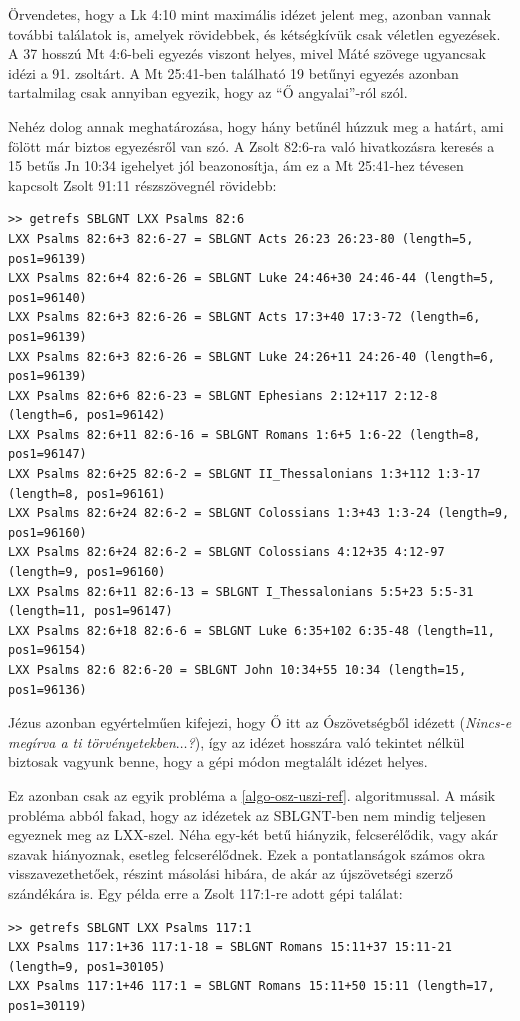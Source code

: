 \documentclass{article}
\begin{document}
Örvendetes, hogy a Lk 4:10 mint maximális idézet jelent meg, azonban vannak további találatok is,
amelyek rövidebbek, és kétségkívük csak véletlen egyezések. A 37 hosszú Mt 4:6-beli egyezés viszont
helyes, mivel Máté szövege ugyancsak idézi a 91. zsoltárt. A Mt 25:41-ben található 19
betűnyi egyezés azonban tartalmilag csak annyiban egyezik, hogy az ``Ő angyalai''-ról szól.

Nehéz dolog annak meghatározása, hogy hány betűnél húzzuk meg a határt, ami fölött már biztos
egyezésről van szó. A Zsolt 82:6-ra való hivatkozásra keresés a 15 betűs Jn 10:34 igehelyet
jól beazonosítja, ám ez a Mt 25:41-hez tévesen kapcsolt Zsolt 91:11 részszövegnél rövidebb:
\begin{lstlisting}
>> getrefs SBLGNT LXX Psalms 82:6
LXX Psalms 82:6+3 82:6-27 = SBLGNT Acts 26:23 26:23-80 (length=5, pos1=96139)
LXX Psalms 82:6+4 82:6-26 = SBLGNT Luke 24:46+30 24:46-44 (length=5, pos1=96140)
LXX Psalms 82:6+3 82:6-26 = SBLGNT Acts 17:3+40 17:3-72 (length=6, pos1=96139)
LXX Psalms 82:6+3 82:6-26 = SBLGNT Luke 24:26+11 24:26-40 (length=6, pos1=96139)
LXX Psalms 82:6+6 82:6-23 = SBLGNT Ephesians 2:12+117 2:12-8 (length=6, pos1=96142)
LXX Psalms 82:6+11 82:6-16 = SBLGNT Romans 1:6+5 1:6-22 (length=8, pos1=96147)
LXX Psalms 82:6+25 82:6-2 = SBLGNT II_Thessalonians 1:3+112 1:3-17 (length=8, pos1=96161)
LXX Psalms 82:6+24 82:6-2 = SBLGNT Colossians 1:3+43 1:3-24 (length=9, pos1=96160)
LXX Psalms 82:6+24 82:6-2 = SBLGNT Colossians 4:12+35 4:12-97 (length=9, pos1=96160)
LXX Psalms 82:6+11 82:6-13 = SBLGNT I_Thessalonians 5:5+23 5:5-31 (length=11, pos1=96147)
LXX Psalms 82:6+18 82:6-6 = SBLGNT Luke 6:35+102 6:35-48 (length=11, pos1=96154)
LXX Psalms 82:6 82:6-20 = SBLGNT John 10:34+55 10:34 (length=15, pos1=96136)
\end{lstlisting}
Jézus azonban egyértelműen kifejezi, hogy Ő itt az Ószövetségből idézett (\textit{Nincs-e
megírva a ti törvényetekben$\ldots$?}), így az idézet hosszára való tekintet
nélkül biztosak vagyunk benne, hogy a gépi módon megtalált idézet helyes.

Ez azonban csak az egyik probléma a \ref{algo-osz-uszi-ref}. algoritmussal.
A másik probléma abból fakad, hogy az idézetek az SBLGNT-ben nem mindig teljesen egyeznek meg
az LXX-szel. Néha egy-két betű hiányzik, felcserélődik, vagy akár szavak hiányoznak, esetleg
felcserélődnek. Ezek a pontatlanságok számos okra visszavezethetőek, részint másolási
hibára, de akár az újszövetségi szerző szándékára is.
Egy példa erre a Zsolt 117:1-re adott gépi találat:
\begin{lstlisting}
>> getrefs SBLGNT LXX Psalms 117:1
LXX Psalms 117:1+36 117:1-18 = SBLGNT Romans 15:11+37 15:11-21 (length=9, pos1=30105)
LXX Psalms 117:1+46 117:1 = SBLGNT Romans 15:11+50 15:11 (length=17, pos1=30119)
\end{lstlisting}
\end{document}
